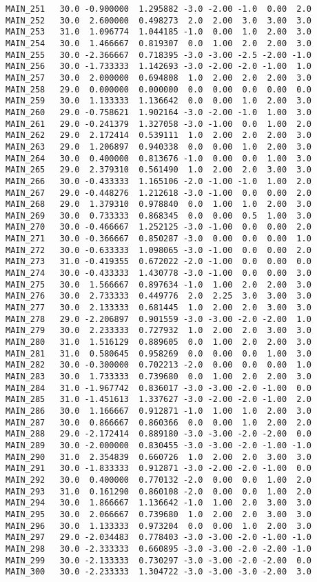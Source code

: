 \documentclass[a4paper,10pt,onecolumn,oneside,openright]{article}
\begin{document}
\begin{verbatim}
MAIN_251   30.0 -0.900000  1.295882 -3.0 -2.00 -1.0  0.00  2.0
MAIN_252   30.0  2.600000  0.498273  2.0  2.00  3.0  3.00  3.0
MAIN_253   31.0  1.096774  1.044185 -1.0  0.00  1.0  2.00  3.0
MAIN_254   30.0  1.466667  0.819307  0.0  1.00  2.0  2.00  3.0
MAIN_255   30.0 -2.366667  0.718395 -3.0 -3.00 -2.5 -2.00 -1.0
MAIN_256   30.0 -1.733333  1.142693 -3.0 -2.00 -2.0 -1.00  1.0
MAIN_257   30.0  2.000000  0.694808  1.0  2.00  2.0  2.00  3.0
MAIN_258   29.0  0.000000  0.000000  0.0  0.00  0.0  0.00  0.0
MAIN_259   30.0  1.133333  1.136642  0.0  0.00  1.0  2.00  3.0
MAIN_260   29.0 -0.758621  1.902164 -3.0 -2.00 -1.0  1.00  3.0
MAIN_261   29.0 -0.241379  1.327058 -3.0 -1.00  0.0  1.00  2.0
MAIN_262   29.0  2.172414  0.539111  1.0  2.00  2.0  2.00  3.0
MAIN_263   29.0  1.206897  0.940338  0.0  0.00  1.0  2.00  3.0
MAIN_264   30.0  0.400000  0.813676 -1.0  0.00  0.0  1.00  3.0
MAIN_265   29.0  2.379310  0.561490  1.0  2.00  2.0  3.00  3.0
MAIN_266   30.0 -0.433333  1.165106 -2.0 -1.00 -1.0  1.00  2.0
MAIN_267   29.0 -0.448276  1.212618 -3.0 -1.00  0.0  0.00  2.0
MAIN_268   29.0  1.379310  0.978840  0.0  1.00  1.0  2.00  3.0
MAIN_269   30.0  0.733333  0.868345  0.0  0.00  0.5  1.00  3.0
MAIN_270   30.0 -0.466667  1.252125 -3.0 -1.00  0.0  0.00  2.0
MAIN_271   30.0 -0.366667  0.850287 -3.0  0.00  0.0  0.00  1.0
MAIN_272   30.0 -0.633333  1.098065 -3.0 -1.00  0.0  0.00  2.0
MAIN_273   31.0 -0.419355  0.672022 -2.0 -1.00  0.0  0.00  0.0
MAIN_274   30.0 -0.433333  1.430778 -3.0 -1.00  0.0  0.00  3.0
MAIN_275   30.0  1.566667  0.897634 -1.0  1.00  2.0  2.00  3.0
MAIN_276   30.0  2.733333  0.449776  2.0  2.25  3.0  3.00  3.0
MAIN_277   30.0  2.133333  0.681445  1.0  2.00  2.0  3.00  3.0
MAIN_278   29.0 -2.206897  0.901559 -3.0 -3.00 -2.0 -2.00  1.0
MAIN_279   30.0  2.233333  0.727932  1.0  2.00  2.0  3.00  3.0
MAIN_280   31.0  1.516129  0.889605  0.0  1.00  2.0  2.00  3.0
MAIN_281   31.0  0.580645  0.958269  0.0  0.00  0.0  1.00  3.0
MAIN_282   30.0 -0.300000  0.702213 -2.0  0.00  0.0  0.00  1.0
MAIN_283   30.0  1.733333  0.739680  0.0  1.00  2.0  2.00  3.0
MAIN_284   31.0 -1.967742  0.836017 -3.0 -3.00 -2.0 -1.00  0.0
MAIN_285   31.0 -1.451613  1.337627 -3.0 -2.00 -2.0 -1.00  2.0
MAIN_286   30.0  1.166667  0.912871 -1.0  1.00  1.0  2.00  3.0
MAIN_287   30.0  0.866667  0.860366  0.0  0.00  1.0  2.00  2.0
MAIN_288   29.0 -2.172414  0.889180 -3.0 -3.00 -2.0 -2.00  0.0
MAIN_289   30.0 -2.000000  0.830455 -3.0 -3.00 -2.0 -1.00 -1.0
MAIN_290   31.0  2.354839  0.660726  1.0  2.00  2.0  3.00  3.0
MAIN_291   30.0 -1.833333  0.912871 -3.0 -2.00 -2.0 -1.00  0.0
MAIN_292   30.0  0.400000  0.770132 -2.0  0.00  0.0  1.00  2.0
MAIN_293   31.0  0.161290  0.860108 -2.0  0.00  0.0  1.00  2.0
MAIN_294   30.0  1.866667  1.136642 -1.0  1.00  2.0  3.00  3.0
MAIN_295   30.0  2.066667  0.739680  1.0  2.00  2.0  3.00  3.0
MAIN_296   30.0  1.133333  0.973204  0.0  0.00  1.0  2.00  3.0
MAIN_297   29.0 -2.034483  0.778403 -3.0 -3.00 -2.0 -1.00 -1.0
MAIN_298   30.0 -2.333333  0.660895 -3.0 -3.00 -2.0 -2.00 -1.0
MAIN_299   30.0 -2.133333  0.730297 -3.0 -3.00 -2.0 -2.00  0.0
MAIN_300   30.0 -2.233333  1.304722 -3.0 -3.00 -3.0 -2.00  3.0
\end{verbatim}
\end{document}
